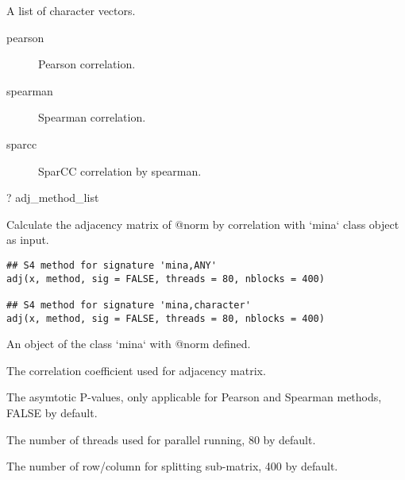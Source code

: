 \documentclass[a4paper]{book}
\begin{document}
%
\begin{Format}
A list of character vectors.
\begin{description}

\item[pearson] 
Pearson correlation.

\item[spearman] 
Spearman correlation.

\item[sparcc] 
SparCC correlation by spearman.



\end{description}

\end{Format}
%
\begin{SeeAlso}\relax
{}
\end{SeeAlso}
%
\begin{Examples}
\begin{ExampleCode}
? adj_method_list
\end{ExampleCode}
\end{Examples}
%
\begin{Description}\relax
Calculate the adjacency matrix of @norm by correlation with `mina` class
object as input.
\end{Description}
%
\begin{Usage}
\begin{verbatim}
## S4 method for signature 'mina,ANY'
adj(x, method, sig = FALSE, threads = 80, nblocks = 400)

## S4 method for signature 'mina,character'
adj(x, method, sig = FALSE, threads = 80, nblocks = 400)
\end{verbatim}
\end{Usage}
%
\begin{Arguments}
\begin{ldescription}
\item[\code{x}] An object of the class `mina` with @norm defined.

\item[\code{method}] The correlation coefficient used for adjacency matrix.

\item[\code{sig}] The asymtotic P-values, only applicable for Pearson and Spearman
methods, FALSE by default.

\item[\code{threads}] The number of threads used for parallel running, 80 by
default.

\item[\code{nblocks}] The number of row/column for splitting sub-matrix, 400 by
default.
\end{ldescription}
\end{Arguments}
\end{document}

